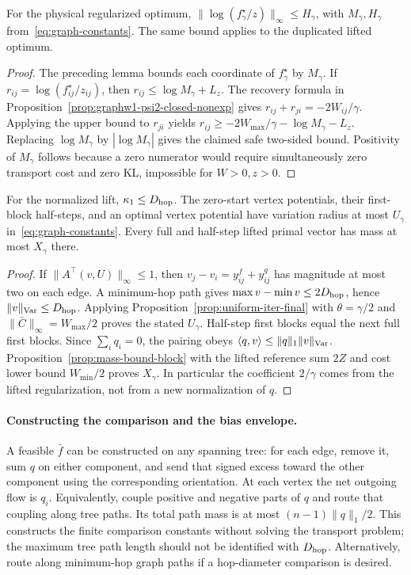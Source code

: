 \begin{proposition}\label{app-prop:hgamma-graphw1}
For the physical regularized optimum, $\|\log(f_\gamma^\star/z)\|_\infty\leq H_\gamma$, with $M_\gamma,H_\gamma$ from~\eqref{eq:graph-constants}. The same bound applies to the duplicated lifted optimum.
\end{proposition}
\begin{proof}
The preceding lemma bounds each coordinate of $f_\gamma^\star$ by $M_\gamma$. If $r_{ij}=\log(f_{ij}^\star/z_{ij})$, then $r_{ij}\leq\log M_\gamma+L_z$. The recovery formula in Proposition~\ref{prop:graphw1-psi2-closed-nonexp} gives
$r_{ij}+r_{ji}=-2W_{ij}/\gamma$.
Applying the upper bound to $r_{ji}$ yields $r_{ij}\geq-2W_{\max}/\gamma-\log M_\gamma-L_z$. Replacing $\log M_\gamma$ by $|\log M_\gamma|$ gives the claimed safe two-sided bound. Positivity of $M_\gamma$ follows because a zero numerator would require simultaneously zero transport cost and zero KL, impossible for $W>0,z>0$.
\end{proof}

\begin{proposition}\label{app-prop:kappa-graph-diameter}
For the normalized lift, $\kappa_1\leq D_{\mathrm{hop}}$. The zero-start vertex potentials, their first-block half-steps, and an optimal vertex potential have variation radius at most $U_\gamma$ in~\eqref{eq:graph-constants}. Every full and half-step lifted primal vector has mass at most $X_\gamma$ there.
\end{proposition}
\begin{proof}
If $\|A^\top(v,U)\|_\infty\leq1$, then $v_j-v_i=y^f_{ij}+y^g_{ij}$ has magnitude at most two on each edge. A minimum-hop path gives $\max v-\min v\leq2D_{\mathrm{hop}}$, hence $\|v\|_{\rm Var}\leq D_{\mathrm{hop}}$. Applying Proposition~\ref{prop:uniform-iter-final} with $\theta=\gamma/2$ and $\|\bar C\|_\infty=W_{\max}/2$ proves the stated $U_\gamma$. Half-step first blocks equal the next full first blocks. Since $\sum_iq_i=0$, the pairing obeys $\langle q,v\rangle\leq\|q\|_1\|v\|_{\rm Var}$. Proposition~\ref{prop:mass-bound-block} with the lifted reference sum $2Z$ and cost lower bound $W_{\min}/2$ proves $X_\gamma$. In particular the coefficient $2/\gamma$ comes from the lifted regularization, not from a new normalization of $q$.
\end{proof}

\paragraph{Constructing the comparison and the bias envelope.}
A feasible $\bar f$ can be constructed on any spanning tree: for each edge, remove it, sum $q$ on either component, and send that signed excess toward the other component using the corresponding orientation. At each vertex the net outgoing flow is $q_i$. Equivalently, couple positive and negative parts of $q$ and route that coupling along tree paths. Its total path mass is at most $(n-1)\|q\|_1/2$. This constructs the finite comparison constants without solving the transport problem; the maximum tree path length should not be identified with $D_{\mathrm{hop}}$. Alternatively, route along minimum-hop graph paths if a hop-diameter comparison is desired.

